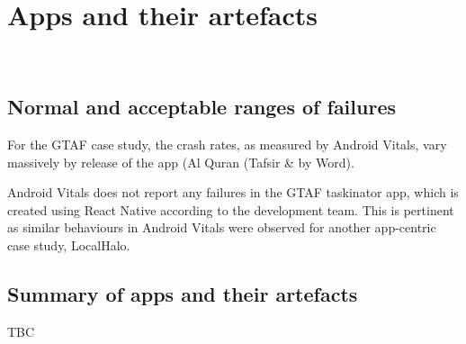 \chapter{Apps and their artefacts}~\label{chapter-apps-and-their-artefacts}

\section{Normal and acceptable ranges of failures}
For the GTAF case study, the crash rates, as measured by Android Vitals, vary massively by release of the app (Al Quran (Tafsir \& by Word). 

Android Vitals does not report any failures in the GTAF taskinator app, which is created using React Native according to the development team. This is pertinent as similar behaviours in Android Vitals were observed for another app-centric case study, LocalHalo. 



\section{Summary of apps and their artefacts}
TBC